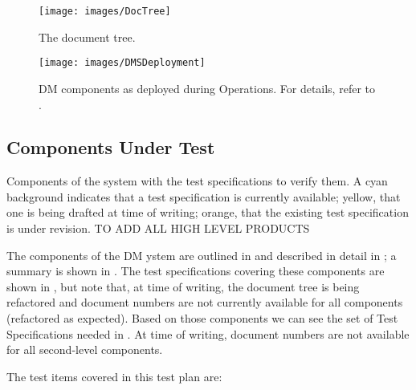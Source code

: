 \begin{figure}
\begin{center}
 \texttt{[image: images/DocTree]}

 \caption{The \product{} document tree.}
 \label{fig:doctree}

\end{center}
\end{figure}

\begin{figure}[htbp]
	\begin{center}
		\texttt{[image: images/DMSDeployment]}
		\caption{DM components as deployed during Operations. For details, refer to .
		\label{fig:dmsdeploy}}
	\end{center}
\end{figure}

\subsection{Components Under Test}

\begin{table}
	\caption{Components of the \product{} system with the test specifications to verify them.
    A cyan background indicates that a test specification is currently available; yellow, that one is being drafted at time of writing; orange, that the existing test specification is under revision. TO ADD ALL HIGH LEVEL PRODUCTS}
    \label{tab:testspecs}
	
\end{table}

The components of the DM ystem are outlined in  and described in detail in ; a summary is shown in .
The test specifications covering these components are shown in , but note that, at time of writing, the document tree is being refactored and document numbers are not currently available for all components (refactored as expected).
Based on those components we can see the set of Test Specifications needed in .
At time of writing, document numbers are not available for all second-level components.

The test items covered in this test plan are:

